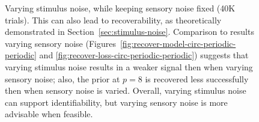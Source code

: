 \documentclass[si.tex]{subfiles}
\begin{document}
\begin{figure}
\caption{Varying stimulus noise, while keeping sensory noise fixed (40K trials).
This can also lead to recoverability, as theoretically demonstrated in Section~\ref{sec:stimulus-noise}.
Comparison to results varying sensory noise (Figures~\ref{fig:recover-model-circ-periodic-periodic} and  \ref{fig:recover-loss-circ-periodic-periodic}) suggests that varying stimulus noise results in a weaker signal then when varying sensory noise; also, the prior at $p=8$ is recovered less successfully then when sensory noise is varied.
Overall, varying stimulus noise can support identifiability, but varying sensory noise is more advisable when feasible.
}\label{fig:stim-noise}

\end{figure}
\end{document}
